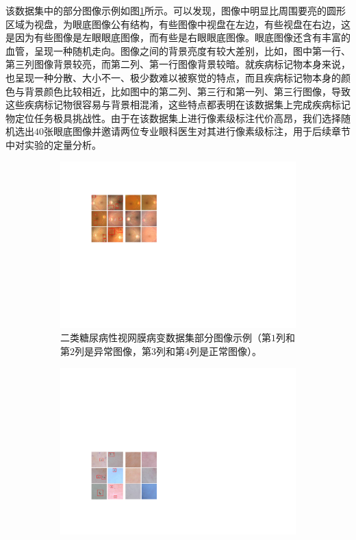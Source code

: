 该数据集中的部分图像示例如图\ref{subfig:bin_dr_ds_example}所示。可以发现，图像中明显比周围要亮的圆形区域为视盘，为眼底图像公有结构，有些图像中视盘在左边，有些视盘在右边，这是因为有些图像是左眼眼底图像，而有些是右眼眼底图像。眼底图像还含有丰富的血管，呈现一种随机走向。图像之间的背景亮度有较大差别，比如，图中第一行、第三列图像背景较亮，而第二列、第一行图像背景较暗。就疾病标记物本身来说，也呈现一种分散、大小不一、极少数难以被察觉的特点，而且疾病标记物本身的颜色与背景颜色比较相近，比如图中的第二列、第三行和第一列、第三行图像，导致这些疾病标记物很容易与背景相混淆，这些特点都表明在该数据集上完成疾病标记物定位任务极具挑战性。由于在该数据集上进行像素级标注代价高昂，我们选择随机选出$40$张眼底图像并邀请两位专业眼科医生对其进行像素级标注，用于后续章节中对实验的定量分析。

\begin{figure}[h!]
	\centering
	\begin{subfigure}{0.48\textwidth}
		\centering
		\includegraphics[width=1\textwidth]{figure/bin_dr_ds_example}
		\caption{二类糖尿病性视网膜病变数据集部分图像示例（第$1$列和第$2$列是异常图像，第$3$列和第$4$列是正常图像）。}
		\label{subfig:bin_dr_ds_example}
	\end{subfigure}
	\quad
	\begin{subfigure}{0.48\textwidth}
		\centering
		\includegraphics[width=1\textwidth]{figure/bin_simulate_skin_example}

\end{subfigure}
\end{figure}
